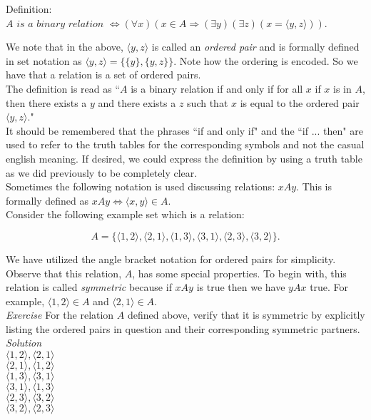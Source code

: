 Definition:  $A \textit{ is a binary relation } \Longleftrightarrow (\forall x) (x \in A \Longrightarrow (\exists y)(\exists z)(x=\langle y,z \rangle))$.

We note that in the above, $\langle y, z \rangle$ is called an \textit{ordered pair} and is formally defined in set notation as $\langle y, z \rangle = \{\{y\}, \{y,z\}\}$.  Note how the ordering is encoded.  So we have that a relation is a set of ordered pairs.\\

The definition is read as ``$A$ is a binary relation if and only if for all $x$ if $x$ is in $A$, then there exists a $y$ and there exists a $z$ such that $x$ is equal to the ordered pair $\langle y, z \rangle$." \\

It should be remembered that the phrases ``if and only if" and the ``if ... then" are used to refer to the truth tables for the corresponding symbols and not the casual english meaning.  If desired, we could express the definition by using a truth table as we did previously to be completely clear.\\

Sometimes the following notation is used discussing relations: $x A y$.  This is formally defined as $x A y \Longleftrightarrow \langle x,y \rangle \in A$.\\

Consider the following example set which is a relation:

\begin{displaymath}
A=\{\langle 1,2 \rangle, \langle 2,1 \rangle,  \langle 1,3 \rangle,  \langle 3,1 \rangle,  \langle 2,3 \rangle,  \langle 3,2 \rangle \}.
\end{displaymath}

We have utilized the angle bracket notation for ordered pairs for simplicity.  Observe that this relation, $A$, has some special properties.  To begin with, this relation is called \textit{symmetric} because if $xAy$ is true then we have $yAx$ true.  For example, $\langle 1, 2 \rangle \in A $ and $\langle 2, 1 \rangle \in A$.\\

\textit{Exercise} For the relation $A$ defined above, verify that it is symmetric by explicitly listing the ordered pairs in question and their corresponding symmetric partners.\\

\textit{Solution}\\
$\langle 1, 2 \rangle, \langle 2, 1 \rangle$  \\
$\langle 2, 1 \rangle, \langle 1, 2 \rangle$  \\
$\langle 1, 3 \rangle, \langle 3, 1 \rangle$  \\
$\langle 3, 1 \rangle, \langle 1, 3 \rangle$  \\
$\langle 2, 3 \rangle, \langle 3, 2 \rangle$  \\
$\langle 3, 2 \rangle, \langle 2, 3 \rangle$  \\ 

